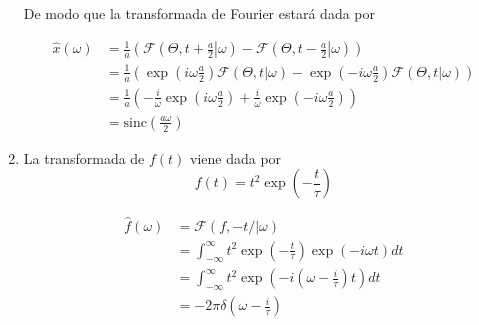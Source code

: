 \documentclass[a4paper,12pt,final]{article}
\begin{document}
\begin{enumerate}[label=\alph*)]
          \noindent De modo que la transformada de Fourier estará dada por

          \begin{equation*}
            \begin{split}
              \widehat{x}\left(\omega\right) & = \frac{1}{a}\left(
                                                   \mathcal{F}\left(\Theta,\left.t + \frac{a}{2}\right|\omega\right) -
                                                   \mathcal{F}\left(\Theta,\left.t - \frac{a}{2}\right|\omega\right)
                                                 \right) \\
                                             & = \frac{1}{a}\left(
                                                   \exp\left( i\omega\frac{a}{2}\right)\mathcal{F}\left(\Theta,t|\omega\right) -
                                                   \exp\left(-i\omega\frac{a}{2}\right)\mathcal{F}\left(\Theta,t|\omega\right)
                                                 \right) \\
                                             & = \frac{1}{a}\left(
                                                   -\frac{i}{\omega}\exp\left( i\omega\frac{a}{2}\right)
                                                   +\frac{i}{\omega}\exp\left(-i\omega\frac{a}{2}\right)
                                                 \right) \\
                                             & = \mathrm{sinc}\left(\frac{a\omega}{2}\right)
            \end{split}
          \end{equation*}

        \item La transformada de $f\left(t\right)$ viene dada por
          $$f\left(t\right) = t^2\exp\left(-\frac{t}{\tau}\right)$$

          \begin{equation*}
            \begin{split}
              \widehat{f}\left(\omega\right) & = \mathcal{F}\left(f,-t/|\omega\right) \\
                                             & = \int_{-\infty}^{\infty}t^2\exp\left(-\frac{t}{\tau}\right)\exp\left(-i \omega t\right)dt \\
                                             & = \int_{-\infty}^{\infty}t^2\exp\left(-i \left(\omega - \frac{i}{\tau} \right) t\right)dt \\
                                             & = -2 \pi \delta\left(\omega - \frac{i}{\tau} \right)
            \end{split}
          \end{equation*}


\end{enumerate}
\end{document}
